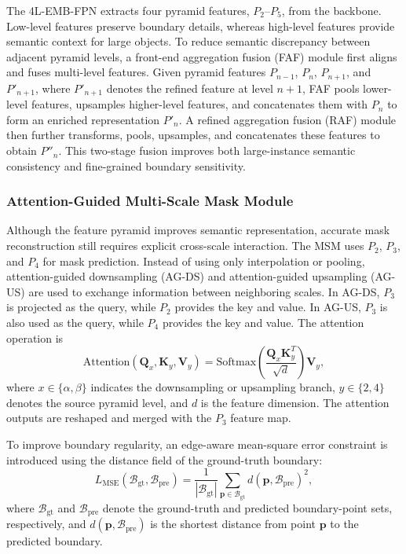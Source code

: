 The 4L-EMB-FPN extracts four pyramid features, $P_2$--$P_5$, from the backbone. Low-level features preserve boundary details, whereas high-level features provide semantic context for large objects. To reduce semantic discrepancy between adjacent pyramid levels, a front-end aggregation fusion (FAF) module first aligns and fuses multi-level features. Given pyramid features $P_{n-1}$, $P_n$, $P_{n+1}$, and $P'_{n+1}$, where $P'_{n+1}$ denotes the refined feature at level $n+1$, FAF pools lower-level features, upsamples higher-level features, and concatenates them with $P_n$ to form an enriched representation $P'_n$. A refined aggregation fusion (RAF) module then further transforms, pools, upsamples, and concatenates these features to obtain $P''_n$. This two-stage fusion improves both large-instance semantic consistency and fine-grained boundary sensitivity.

\subsubsection{Attention-Guided Multi-Scale Mask Module}
Although the feature pyramid improves semantic representation, accurate mask reconstruction still requires explicit cross-scale interaction. The MSM uses $P_2$, $P_3$, and $P_4$ for mask prediction. Instead of using only interpolation or pooling, attention-guided downsampling (AG-DS) and attention-guided upsampling (AG-US) are used to exchange information between neighboring scales. In AG-DS, $P_3$ is projected as the query, while $P_2$ provides the key and value. In AG-US, $P_3$ is also used as the query, while $P_4$ provides the key and value. The attention operation is
\begin{equation}
\mathrm{Attention}(\boldsymbol{Q}_{x},\boldsymbol{K}_{y},\boldsymbol{V}_{y})=
\mathrm{Softmax}\left(\frac{\boldsymbol{Q}_{x}\boldsymbol{K}_{y}^{T}}{\sqrt{d}}\right)\boldsymbol{V}_{y},
\label{eq:attention}
\end{equation}
where $x\in\{\alpha,\beta\}$ indicates the downsampling or upsampling branch, $y\in\{2,4\}$ denotes the source pyramid level, and $d$ is the feature dimension. The attention outputs are reshaped and merged with the $P_3$ feature map.

To improve boundary regularity, an edge-aware mean-square error constraint is introduced using the distance field of the ground-truth boundary:
\begin{equation}
L_{\mathrm{MSE}}(\mathcal{B}_{\text{gt}},\mathcal{B}_{\text{pre}})=
\frac{1}{|\mathcal{B}_{\text{gt}}|}\sum_{\boldsymbol{p}\in\mathcal{B}_{\text{gt}}}d(\boldsymbol{p},\mathcal{B}_{\text{pre}})^{2},
\label{eq:mse}
\end{equation}
where $\mathcal{B}_{\text{gt}}$ and $\mathcal{B}_{\text{pre}}$ denote the ground-truth and predicted boundary-point sets, respectively, and $d(\boldsymbol{p},\mathcal{B}_{\text{pre}})$ is the shortest distance from point $\boldsymbol{p}$ to the predicted boundary.


